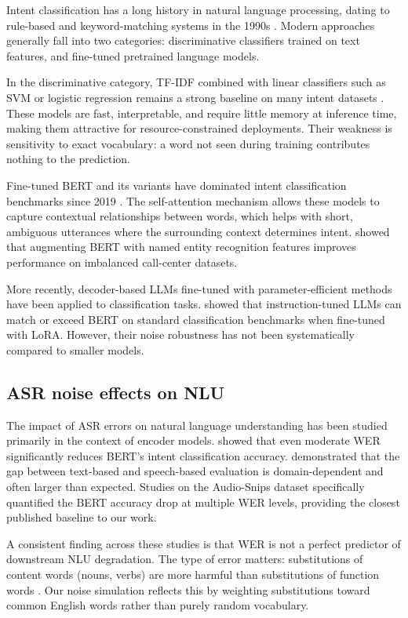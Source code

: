 \documentclass[11pt,a4paper]{article}
\begin{document}
Intent classification has a long history in natural language processing, dating to rule-based and keyword-matching systems in the 1990s \citep{tur2011spoken}. Modern approaches generally fall into two categories: discriminative classifiers trained on text features, and fine-tuned pretrained language models.

In the discriminative category, TF-IDF combined with linear classifiers such as SVM or logistic regression remains a strong baseline on many intent datasets \citep{joulin2017bag}. These models are fast, interpretable, and require little memory at inference time, making them attractive for resource-constrained deployments. Their weakness is sensitivity to exact vocabulary: a word not seen during training contributes nothing to the prediction.

Fine-tuned BERT and its variants have dominated intent classification benchmarks since 2019 \citep{devlin2019bert}. The self-attention mechanism allows these models to capture contextual relationships between words, which helps with short, ambiguous utterances where the surrounding context determines intent. \citet{yamashita2023bert} showed that augmenting BERT with named entity recognition features improves performance on imbalanced call-center datasets.

More recently, decoder-based LLMs fine-tuned with parameter-efficient methods have been applied to classification tasks. \citet{sun2023text} showed that instruction-tuned LLMs can match or exceed BERT on standard classification benchmarks when fine-tuned with LoRA. However, their noise robustness has not been systematically compared to smaller models.

\subsection{ASR noise effects on NLU}

The impact of ASR errors on natural language understanding has been studied primarily in the context of encoder models. \citet{faruqui2021revisiting} showed that even moderate WER significantly reduces BERT's intent classification accuracy. \citet{shon2022slue} demonstrated that the gap between text-based and speech-based evaluation is domain-dependent and often larger than expected. Studies on the Audio-Snips dataset specifically quantified the BERT accuracy drop at multiple WER levels, providing the closest published baseline to our work.

A consistent finding across these studies is that WER is not a perfect predictor of downstream NLU degradation. The type of error matters: substitutions of content words (nouns, verbs) are more harmful than substitutions of function words \citep{faruqui2021revisiting}. Our noise simulation reflects this by weighting substitutions toward common English words rather than purely random vocabulary.
\end{document}
